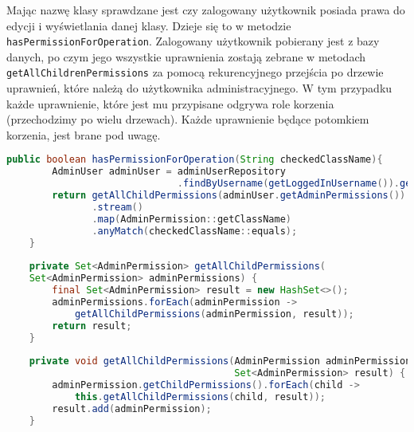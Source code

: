 Mając nazwę klasy sprawdzane jest czy zalogowany użytkownik posiada prawa do edycji i wyświetlania danej klasy. Dzieje się to w metodzie \texttt{hasPermissionForOperation}. Zalogowany użytkownik pobierany jest z bazy danych, po czym jego wszystkie uprawnienia zostają zebrane w metodach \texttt{getAllChildrenPermissions} za pomocą rekurencyjnego przejścia po drzewie uprawnień, które należą do użytkownika administracyjnego. W tym przypadku każde uprawnienie, które jest mu przypisane odgrywa role korzenia (przechodzimy po wielu drzewach). Każde uprawnienie będące potomkiem korzenia, jest brane pod uwagę.

\begin{small}
	\begin{lstlisting}[language=Java, frame=lines, numberstyle=\tiny, stepnumber=5, caption=Sprawdzenie uprawnień i algorytm przeszukiwania drzewa: \texttt{PermissionService.java}\label{listing_permission}., firstnumber=1]
	public boolean hasPermissionForOperation(String checkedClassName){
	    AdminUser adminUser = adminUserRepository
	                          .findByUsername(getLoggedInUsername()).get();
	    return getAllChildPermissions(adminUser.getAdminPermissions())
	           .stream()
	           .map(AdminPermission::getClassName)
	           .anyMatch(checkedClassName::equals);
	}
	
	private Set<AdminPermission> getAllChildPermissions(
	Set<AdminPermission> adminPermissions) {
	    final Set<AdminPermission> result = new HashSet<>();
	    adminPermissions.forEach(adminPermission -> 
	        getAllChildPermissions(adminPermission, result));
	    return result;
	}
	
	private void getAllChildPermissions(AdminPermission adminPermission, 
	                                    Set<AdminPermission> result) {
	    adminPermission.getChildPermissions().forEach(child ->     
	        this.getAllChildPermissions(child, result));
	    result.add(adminPermission);
	}
	\end{lstlisting} 
\end{small}


